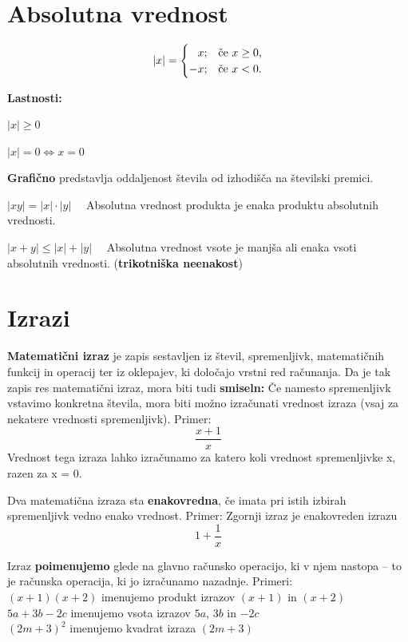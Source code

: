 \documentclass[a4paper,oneside,12pt,fleqn]{article}
\newcommand\krat\cdot
\renewcommand\iff\Leftrightarrow
\numberwithin{equation}{section}
\newenvironment{itemize*}%
{
\vspace{-12pt}%
\begin{itemize}%
\setlength{\itemsep}{0pt}%
\setlength{\parskip}{2pt}}%
{\end{itemize}}
\begin{document}
\section{Absolutna vrednost}
\begin{equation}
  \label{eq:abs}
  \left| x \right| = 
  \begin{cases} 
    \hfill  x; & \text{če $x \geq 0$,} \\
    \hfill -x; & \text{če $x < 0$.}
  \end{cases}
\end{equation}

\textbf{Lastnosti:}
\begin{itemize*}
  \item $|x| \geq 0$
  \item $|x| = 0 \iff x = 0$
  \item \textbf{Grafično} predstavlja oddaljenost števila od izhodišča na številski premici.
  \item $|xy| = |x| \krat |y| \quad$ Absolutna vrednost produkta je enaka produktu
    absolutnih vrednosti.
  \item $|x+y| \leq |x| + |y| \quad$ Absolutna vrednost vsote je manjša ali enaka vsoti
    absolutnih vrednosti. (\textbf{trikotniška neenakost})
\end{itemize*}

\section{Izrazi}
\label{sec:izr}
\textbf{Matematični izraz} je zapis sestavljen iz števil, spremenljivk, matematičnih funkcij in
operacij ter iz oklepajev, ki določajo vrstni red računanja. Da je tak zapis res
matematični izraz, mora biti tudi \textbf{smiseln:} Če namesto spremenljivk vstavimo konkretna
števila, mora biti možno izračunati vrednost izraza (vsaj za nekatere vrednosti
spremenljivk).
Primer:
\[ \frac{x + 1}{x} \]
Vrednost tega izraza lahko izračunamo za katero koli vrednost
spremenljivke x, razen za x = 0.

Dva matematična izraza sta \textbf{enakovredna}, če imata pri istih izbirah spremenljivk vedno
enako vrednost.
Primer: Zgornji izraz je enakovreden izrazu 
\[ 1 + \frac{1}{x} \]

Izraz \textbf{poimenujemo} glede na glavno računsko operacijo, ki v njem nastopa -- to je računska
operacija, ki jo izračunamo nazadnje.
Primeri: \\
$(x + 1)(x + 2)$ imenujemo produkt izrazov $(x + 1)$ in $(x + 2)$ \\
$5a + 3b - 2c$ imenujemo vsota izrazov $5a$, $3b$ in $-2c$ \\
$(2m + 3)^2$ imenujemo kvadrat izraza $(2m + 3)$
\end{document}
